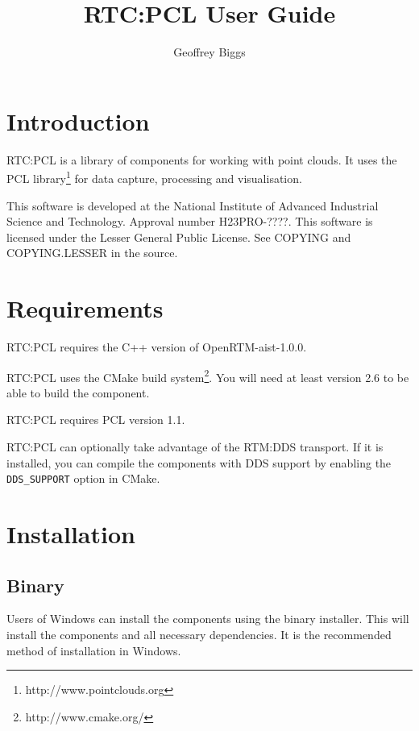 \documentclass[a4paper,10pt]{article}
\title{RTC:PCL User Guide}
\author{Geoffrey Biggs}
\begin{document}
\maketitle

\setcounter{tocdepth}{1}
\tableofcontents

\newpage

\section{Introduction}
\label{sec:intro}

RTC:PCL is a library of components for working with point clouds. It uses the
PCL library\footnote{http://www.pointclouds.org} for data capture, processing
and visualisation.

This software is developed at the National Institute of Advanced Industrial
Science and Technology. Approval number H23PRO-????. This software is licensed
under the Lesser General Public License. See COPYING and COPYING.LESSER in the
source.

\section{Requirements}
\label{sec:requirements}

RTC:PCL requires the C++ version of OpenRTM-aist-1.0.0.

RTC:PCL uses the CMake build system\footnote{http://www.cmake.org/}. You will
need at least version 2.6 to be able to build the component.

RTC:PCL requires PCL version 1.1.

RTC:PCL can optionally take advantage of the RTM:DDS transport. If it is
installed, you can compile the components with DDS support by enabling the
\verb|DDS_SUPPORT| option in CMake.

\section{Installation}
\label{sec:installation}

\subsection{Binary}

Users of Windows can install the components using the binary installer. This
will install the components and all necessary dependencies. It is the
recommended method of installation in Windows.
\end{document}
